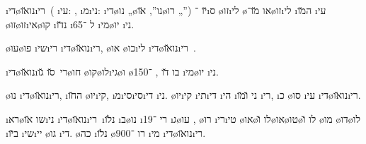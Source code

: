 
\newcommand{\level}{100}

\newcommand{\dinozaurim}{\i{די}\o{נו}\u{או}\i{רי}\s{ם}}



\colInvisibone

\dinozaurim\ ( \i{עי}: , \i{מ}\i{ני}:  \i{די}\o{נו} „\o{נו}”,  \u{או}\o{רו} „”) \u{יו} ־\i{ס}  \o{זו}\i{לי} \o{או} \u{מו}־\o{זו}\i{לי} \i{ה}\u{מו} \i{עי} \o{זו}\o{זו}\i{אי}\o{קו} \i{נ}\u{דו} \i{ל} ־65 \i{מי}\o{יו} \i{ני}.

\o{עו}\o{פו}   \i{שי}\i{רי}  \dinozaurim, \o{או}  \o{כו}\i{לי}  \dinozaurim\ .

\dinozaurim\ \u{סו} \u{גו}\o{חו} \o{קו}\o{לו}\i{גי}\o{ו} \o{בו}   \u{דו} ,  ־150 \i{מי}\o{יו} \i{ני}.

\o{נו} \dinozaurim, \i{ה}\u{חו} \o{יו}\i{קי}, \i{מ}\i{סי}\i{סי}\i{די} \i{ני}. \o{יו}\i{קי} \i{תי}\i{די} \i{הי} \i{ני} \u{ו}\u{מו} \i{רי}, \i{כ}  \o{סו} \i{עי} \dinozaurim.

\i{רא}\o{שו} \u{או}\i{ני}  \dinozaurim\ \i{נ}\u{לו} \i{ב}\o{נו} \i{רי}   ־19   \i{ג}\o{עו} , \o{רו} \i{רי}\i{טי}  \o{או}\o{לו} \u{ו}\o{או}\o{טו}\o{לו} \u{ו} \o{מו} \o{דו}\o{לו} \i{ב}\u{יו} \i{שי}\i{יי} \o{גו}  \i{די}.
 \o{כה} \i{נ}\u{לו} \o{רו} ־900 \i{מי} \dinozaurim.

